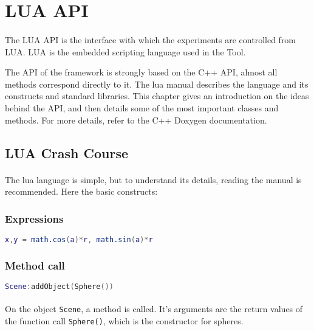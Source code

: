 \section{LUA API\label{LUAAPI}}
\paragraph{}
The LUA API is the interface with which the experiments are controlled from LUA.
LUA is the embedded scripting language used in the Tool.

The API of the framework is strongly based on the C++ API, almost all methods correspond directly to it.
The lua manual\cite{lua} describes the language and its constructs and standard libraries.
This chapter gives an introduction on the ideas behind the API, and then details some of the most important classes and methods. For more details, refer to the C++ Doxygen documentation.


\subsection{LUA Crash Course}
\paragraph{}
The lua language is simple, but to understand its details, reading the manual\cite{lua} is recommended.
Here the basic constructs:

\subsubsection{Expressions}

\begin{lstlisting}[language=lua]
x,y = math.cos(a)*r, math.sin(a)*r
\end{lstlisting}

\subsubsection{Method call}
\begin{lstlisting}[language=lua]
Scene:addObject(Sphere())
\end{lstlisting}

\paragraph{}
On the object  \texttt{Scene}, a method is called. It's arguments are the return values of the function call \texttt{Sphere()}, which is the constructor for spheres.


